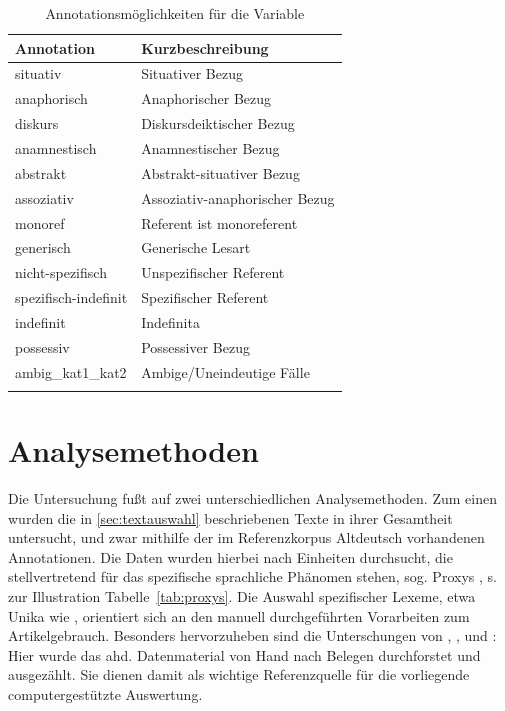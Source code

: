 \begin{table}
\centering
\begin{tabular}{ll}
\lsptoprule
Annotation & Kurzbeschreibung  \\ \midrule
situativ            & Situativer Bezug               \\
anaphorisch         & Anaphorischer Bezug            \\
diskurs             & Diskursdeiktischer Bezug      \\
anamnestisch        & Anamnestischer Bezug           \\
abstrakt            & Abstrakt-situativer Bezug      \\
assoziativ          & Assoziativ-anaphorischer Bezug \\
monoref             & Referent ist monoreferent      \\
generisch           & Generische Lesart              \\
nicht-spezifisch        & Unspezifischer Referent           \\
spezifisch-indefinit          & Spezifischer Referent           \\
indefinit           & Indefinita     \\
possessiv           & Possessiver Bezug    \\
ambig\_kat1\_kat2  & Ambige/Uneindeutige Fälle      \\ \lspbottomrule
\end{tabular}
\caption{Annotationsmöglichkeiten für die Variable \label{tab:definitheit}}
\end{table}

\section{Analysemethoden} \label{sec:analysemethoden}

Die Untersuchung fußt auf zwei unterschiedlichen Analysemethoden. Zum einen wurden die in \ref{sec:textauswahl} beschriebenen Texte in ihrer Gesamtheit untersucht, und zwar mithilfe der im Referenzkorpus Altdeutsch vorhandenen Annotationen. Die Daten wurden hierbei nach Einheiten durchsucht, die stellvertretend für das spezifische sprachliche Phänomen stehen, sog. Proxys \parencite[vgl.][114]{Lemnitzer2015}, s. zur Illustration Tabelle~\ref{tab:proxys}. Die Auswahl spezifischer Lexeme, etwa Unika wie  , orientiert sich an den manuell durchgeführten Vorarbeiten zum Artikelgebrauch. Besonders hervorzuheben sind die Unterschungen von \textcite{Graf1905}, \textcite{Bell1907}, \textcite{Hodler1954} und \textcite{Oubouzar1989}: Hier wurde das ahd. Datenmaterial von Hand nach Belegen durchforstet und ausgezählt. Sie dienen damit als wichtige Referenzquelle für die vorliegende computergestützte Auswertung. 

